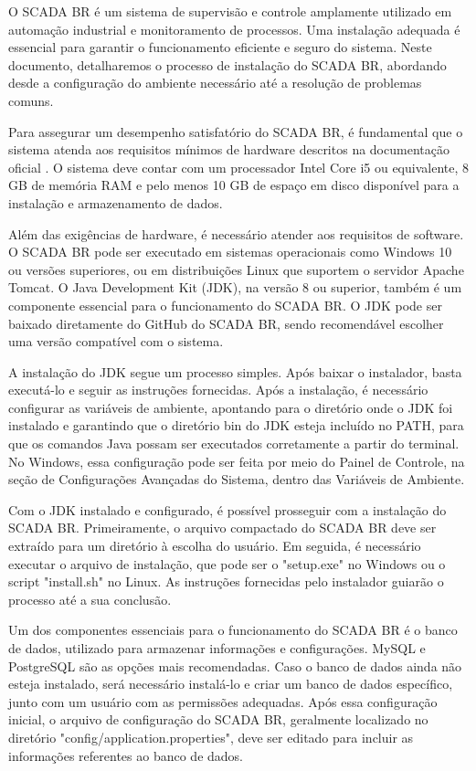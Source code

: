 \begin{anexosenv}
O SCADA BR é um sistema de supervisão e controle amplamente utilizado em automação industrial e monitoramento de processos. Uma instalação adequada é essencial para garantir o funcionamento eficiente e seguro do sistema. Neste documento, detalharemos o processo de instalação do SCADA BR, abordando desde a configuração do ambiente necessário até a resolução de problemas comuns.

Para assegurar um desempenho satisfatório do SCADA BR, é fundamental que o sistema atenda aos requisitos mínimos de hardware descritos na documentação oficial \cite{scadabr_manual}. O sistema deve contar com um processador Intel Core i5 ou equivalente, 8 GB de memória RAM e pelo menos 10 GB de espaço em disco disponível para a instalação e armazenamento de dados.

Além das exigências de hardware, é necessário atender aos requisitos de software. O SCADA BR pode ser executado em sistemas operacionais como Windows 10 ou versões superiores, ou em distribuições Linux que suportem o servidor Apache Tomcat. O Java Development Kit (JDK), na versão 8 ou superior, também é um componente essencial para o funcionamento do SCADA BR. O JDK pode ser baixado diretamente do GitHub do SCADA BR, sendo recomendável escolher uma versão compatível com o sistema.

A instalação do JDK segue um processo simples. Após baixar o instalador, basta executá-lo e seguir as instruções fornecidas. Após a instalação, é necessário configurar as variáveis de ambiente, apontando para o diretório onde o JDK foi instalado e garantindo que o diretório bin do JDK esteja incluído no PATH, para que os comandos Java possam ser executados corretamente a partir do terminal. No Windows, essa configuração pode ser feita por meio do Painel de Controle, na seção de Configurações Avançadas do Sistema, dentro das Variáveis de Ambiente.

Com o JDK instalado e configurado, é possível prosseguir com a instalação do SCADA BR. Primeiramente, o arquivo compactado do SCADA BR deve ser extraído para um diretório à escolha do usuário. Em seguida, é necessário executar o arquivo de instalação, que pode ser o "setup.exe" no Windows ou o script "install.sh" no Linux. As instruções fornecidas pelo instalador guiarão o processo até a sua conclusão.

Um dos componentes essenciais para o funcionamento do SCADA BR é o banco de dados, utilizado para armazenar informações e configurações. MySQL e PostgreSQL são as opções mais recomendadas. Caso o banco de dados ainda não esteja instalado, será necessário instalá-lo e criar um banco de dados específico, junto com um usuário com as permissões adequadas. Após essa configuração inicial, o arquivo de configuração do SCADA BR, geralmente localizado no diretório "config/application.properties", deve ser editado para incluir as informações referentes ao banco de dados.


\end{anexosenv}
